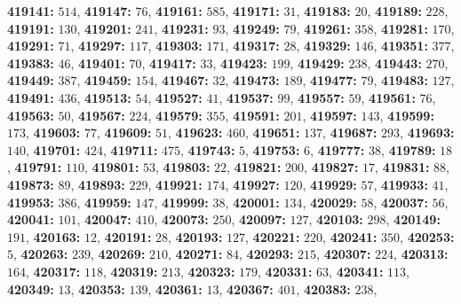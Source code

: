 \textsf{\bfseries 419141:} $514$, \textsf{\bfseries 419147:} $76$, \textsf{\bfseries 419161:} $585$, \textsf{\bfseries 419171:} $31$, \textsf{\bfseries 419183:} $20$, \textsf{\bfseries 419189:} $228$, \textsf{\bfseries 419191:} $130$, \textsf{\bfseries 419201:} $241$, \textsf{\bfseries 419231:} $93$, \textsf{\bfseries 419249:} $79$, \textsf{\bfseries 419261:} $358$, \textsf{\bfseries 419281:} $170$, \textsf{\bfseries 419291:} $71$, \textsf{\bfseries 419297:} $117$, \textsf{\bfseries 419303:} $171$, \textsf{\bfseries 419317:} $28$, \textsf{\bfseries 419329:} $146$, \textsf{\bfseries 419351:} $377$, \textsf{\bfseries 419383:} $46$, \textsf{\bfseries 419401:} $70$, \textsf{\bfseries 419417:} $33$, \textsf{\bfseries 419423:} $199$, \textsf{\bfseries 419429:} $238$, \textsf{\bfseries 419443:} $270$, \textsf{\bfseries 419449:} $387$, \textsf{\bfseries 419459:} $154$, \textsf{\bfseries 419467:} $32$, \textsf{\bfseries 419473:} $189$, \textsf{\bfseries 419477:} $79$, \textsf{\bfseries 419483:} $127$, \textsf{\bfseries 419491:} $436$, \textsf{\bfseries 419513:} $54$, \textsf{\bfseries 419527:} $41$, \textsf{\bfseries 419537:} $99$, \textsf{\bfseries 419557:} $59$, \textsf{\bfseries 419561:} $76$, \textsf{\bfseries 419563:} $50$, \textsf{\bfseries 419567:} $224$, \textsf{\bfseries 419579:} $355$, \textsf{\bfseries 419591:} $201$, \textsf{\bfseries 419597:} $143$, \textsf{\bfseries 419599:} $173$, \textsf{\bfseries 419603:} $77$, \textsf{\bfseries 419609:} $51$, \textsf{\bfseries 419623:} $460$, \textsf{\bfseries 419651:} $137$, \textsf{\bfseries 419687:} $293$, \textsf{\bfseries 419693:} $140$, \textsf{\bfseries 419701:} $424$, \textsf{\bfseries 419711:} $475$, \textsf{\bfseries 419743:} $5$, \textsf{\bfseries 419753:} $6$, \textsf{\bfseries 419777:} $38$, \textsf{\bfseries 419789:} $18$, \textsf{\bfseries 419791:} $110$, \textsf{\bfseries 419801:} $53$, \textsf{\bfseries 419803:} $22$, \textsf{\bfseries 419821:} $200$, \textsf{\bfseries 419827:} $17$, \textsf{\bfseries 419831:} $88$, \textsf{\bfseries 419873:} $89$, \textsf{\bfseries 419893:} $229$, \textsf{\bfseries 419921:} $174$, \textsf{\bfseries 419927:} $120$, \textsf{\bfseries 419929:} $57$, \textsf{\bfseries 419933:} $41$, \textsf{\bfseries 419953:} $386$, \textsf{\bfseries 419959:} $147$, \textsf{\bfseries 419999:} $38$, \textsf{\bfseries 420001:} $134$, \textsf{\bfseries 420029:} $58$, \textsf{\bfseries 420037:} $56$, \textsf{\bfseries 420041:} $101$, \textsf{\bfseries 420047:} $410$, \textsf{\bfseries 420073:} $250$, \textsf{\bfseries 420097:} $127$, \textsf{\bfseries 420103:} $298$, \textsf{\bfseries 420149:} $191$, \textsf{\bfseries 420163:} $12$, \textsf{\bfseries 420191:} $28$, \textsf{\bfseries 420193:} $127$, \textsf{\bfseries 420221:} $220$, \textsf{\bfseries 420241:} $350$, \textsf{\bfseries 420253:} $5$, \textsf{\bfseries 420263:} $239$, \textsf{\bfseries 420269:} $210$, \textsf{\bfseries 420271:} $84$, \textsf{\bfseries 420293:} $215$, \textsf{\bfseries 420307:} $224$, \textsf{\bfseries 420313:} $164$, \textsf{\bfseries 420317:} $118$, \textsf{\bfseries 420319:} $213$, \textsf{\bfseries 420323:} $179$, \textsf{\bfseries 420331:} $63$, \textsf{\bfseries 420341:} $113$, \textsf{\bfseries 420349:} $13$, \textsf{\bfseries 420353:} $139$, \textsf{\bfseries 420361:} $13$, \textsf{\bfseries 420367:} $401$, \textsf{\bfseries 420383:} $238$, 
